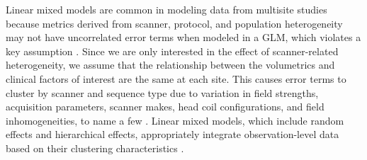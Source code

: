 Linear mixed models are common in modeling data from multisite studies because metrics derived from scanner, protocol, and population heterogeneity may not have uncorrelated error terms when modeled in a GLM, which violates a key assumption \cite{garson2013fundamentals}. Since we are only interested in the effect of scanner-related heterogeneity, we assume that the relationship between the volumetrics and clinical factors of interest are the same at each site. This causes error terms to cluster by scanner and sequence type due to variation in field strengths, acquisition parameters, scanner makes, head coil configurations, and field inhomogeneities, to name a few \cite{cannon2014}. Linear mixed models, which include random effects and hierarchical effects, appropriately integrate observation-level data based on their clustering characteristics \cite{garson2013fundamentals}.